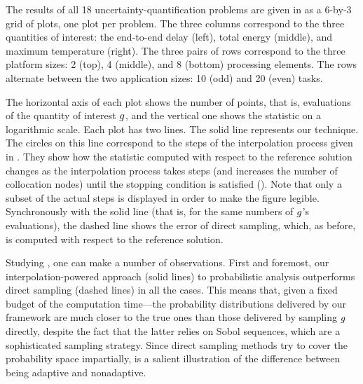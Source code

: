 
The results of all 18 uncertainty-quantification problems are given in
 as a 6-by-3 grid of plots, one plot per problem. The three
columns correspond to the three quantities of interest: the end-to-end delay
(left), total energy (middle), and maximum temperature (right). The three pairs
of rows correspond to the three platform sizes: 2 (top), 4 (middle), and 8
(bottom) processing elements. The rows alternate between the two application
sizes: 10 (odd) and 20 (even) tasks.

The horizontal axis of each plot shows the number of points, that is,
evaluations of the quantity of interest $g$, and the vertical one shows the
 statistic on a logarithmic scale. Each plot has two lines. The solid
line represents our technique. The circles on this line correspond to the steps
of the interpolation process given in . They show how the
 statistic computed with respect to the reference solution changes as the
interpolation process takes steps (and increases the number of collocation
nodes) until the stopping condition is satisfied (). Note that
only a subset of the actual steps is displayed in order to make the figure
legible. Synchronously with the solid line (that is, for the same numbers of
$g$'s evaluations), the dashed line shows the error of direct sampling, which,
as before, is computed with respect to the reference solution.

Studying , one can make a number of observations. First and
foremost, our interpolation-powered approach (solid lines) to probabilistic
analysis outperforms direct sampling (dashed lines) in all the cases. This means
that, given a fixed budget of the computation time---the probability
distributions delivered by our framework are much closer to the true ones than
those delivered by sampling $g$ directly, despite the fact that the latter
relies on Sobol sequences, which are a sophisticated sampling strategy. Since
direct sampling methods try to cover the probability space impartially,
 is a salient illustration of the difference between being
adaptive and nonadaptive.

